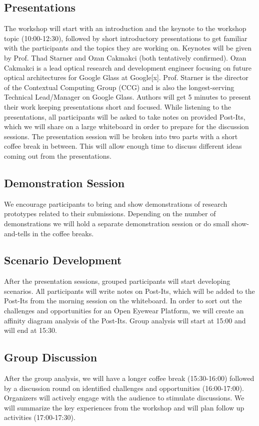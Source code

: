 \documentclass{sigchi-ext}
\begin{document}
\subsection{Presentations}
The workshop will start with an introduction and the keynote to the workshop topic (10:00-12:30), followed by short introductory presentations to get familiar with the participants and the topics they are working on. 
Keynotes will be given by Prof. Thad Starner and Ozan Cakmakci (both  tentatively confirmed). Ozan Cakmakci is a lead optical research and development engineer focusing on future optical architectures for Google Glass at Google[x]. Prof. Starner is the director of the Contextual Computing Group (CCG) and is also the longest-serving Technical Lead/Manager on Google Glass. 
Authors will get 5 minutes to present their work keeping presentations short and focused. While listening to the presentations, all participants will be asked to take notes on provided Post-Its, which we will share on a large whiteboard in order to prepare for the discussion sessions.
The presentation session will be broken into two parts with a short coffee break in between. This will allow enough time to discuss different ideas coming out from the presentations.

\subsection{Demonstration Session}
We encourage participants to bring and show demonstrations of research prototypes related to their submissions. Depending on the number of demonstrations we will hold a separate demonstration session or do small show-and-tells in the coffee breaks.

\subsection{Scenario Development}
After the presentation sessions, grouped participants will start developing scenarios. All participants will write notes on Post-Its, which will be added to the Post-Its from the morning session on the whiteboard. In order to sort out the challenges and opportunities for an Open Eyewear Platform, we will create an affinity diagram analysis of the Post-Its. Group analysis will start at 15:00 and will end at 15:30.

\subsection{Group Discussion}
After the group analysis, we will have a longer coffee break (15:30-16:00) followed by a discussion round on identified challenges and opportunities (16:00-17:00). Organizers will actively engage with the audience to stimulate discussions. We will summarize the key experiences from the workshop and will plan follow up activities (17:00-17:30).
\end{document}
